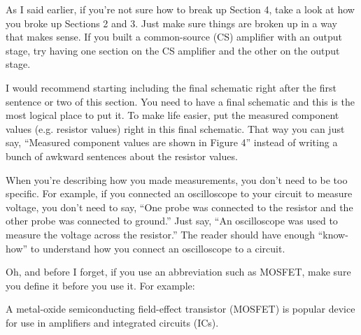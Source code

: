 \documentclass[10pt]{article}
\begin{document}
\noindent As I said earlier, if you’re not sure how to break up Section 4, take a look at how you broke up Sections 2 and 3. Just make sure things are broken up in a way that makes sense. If you built a common-source (CS) amplifier with an output stage, try having one section on the CS amplifier and the other on the output stage.
\newline

\noindent I would recommend starting including the final schematic right after the first sentence or two of this section. You need to have a final schematic and this is the most logical place to put it. To make life easier, put the measured component values (e.g. resistor values) right in this final schematic. That way you can just say, “Measured component values are shown in Figure 4” instead of writing a bunch of awkward sentences about the resistor values.
\newline

\noindent When you’re describing how you made measurements, you don’t need to be too specific. For example, if you connected an oscilloscope to your circuit to measure voltage, you don’t need to say, “One probe was connected to the resistor and the other probe was connected to ground.” Just say, “An oscilloscope was used to measure the voltage across the resistor.” The reader should have enough “know-how” to understand how you connect an oscilloscope to a circuit.
\newline

\noindent Oh, and before I forget, if you use an abbreviation such as MOSFET, make sure you define it before you use it. For example:
\newline

\noindent A metal-oxide semiconducting field-effect transistor (MOSFET) is popular device for use in amplifiers and integrated circuits (ICs).
\newline
\end{document}

